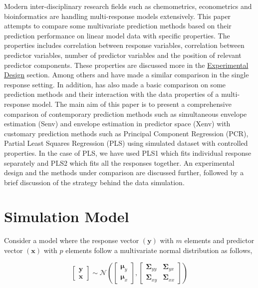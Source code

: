 \documentclass[12pt,3p,authoryear]{elsarticle}
\begin{document}
Modern inter-disciplinary research fields such as chemometrics,
econometrics and bioinformatics are handling multi-response models
extensively. This paper attempts to compare some multivariate prediction
methods based on their prediction performance on linear model data with
specific properties. The properties includes correlation between
response variables, correlation between predictor variables, number of
predictor variables and the position of relevant predictor components.
These properties are discussed more in the
\protect\hyperlink{experimental-design}{Experimental Design} section.
Among others \citet{saebo2015simrel} and \citet{Alm_y_1996} have made a
similar comparison in the single response setting. In addition,
\citet{Rimal2018} has also made a basic comparison on some prediction
methods and their interaction with the data properties of a
multi-response model. The main aim of this paper is to present a
comprehensive comparison of contemporary prediction methods such as
simultaneous envelope estimation (Senv) \citep{cook2015simultaneous} and
envelope estimation in predictor space (Xenv) \citep{cook2010envelope}
with customary prediction methods such as Principal Component Regression
(PCR), Partial Least Squares Regression (PLS) using simulated dataset
with controlled properties. In the case of PLS, we have used PLS1 which
fits individual response separately and PLS2 which fits all the
responses together. An experimental design and the methods under
comparison are discussed further, followed by a brief discussion of the
strategy behind the data simulation.

\section{Simulation Model}\label{simulation-model}

Consider a model where the response vector \((\mathbf{y})\) with \(m\)
elements and predictor vector \((\mathbf{x})\) with \(p\) elements
follow a multivariate normal distribution as follows,

\begin{equation}
  \begin{bmatrix}
    \mathbf{y} \\ \mathbf{x}
  \end{bmatrix} \sim \mathcal{N}
  \left(
    \begin{bmatrix}
      \boldsymbol{\mu}_y \\
      \boldsymbol{\mu}_x
    \end{bmatrix},
    \begin{bmatrix}
    \boldsymbol{\Sigma}_{yy} & \boldsymbol{\Sigma}_{yx} \\
    \boldsymbol{\Sigma}_{xy} & \boldsymbol{\Sigma}_{xx}
    \end{bmatrix}
  \right)
  \label{eq:model-1}
\end{equation}
\end{document}
